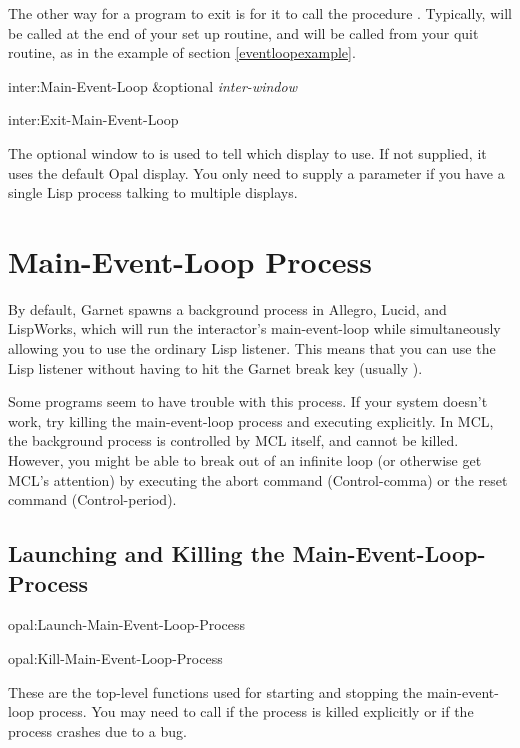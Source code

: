 The other way for a program to exit  is for it to call
the procedure .  Typically,
 will be called at the end of your set up
routine, and  will be called from your quit
routine, as in the example of section \ref{eventloopexample}.

\begin{programexample}
inter:Main-Event-Loop \&optional {\it inter-window}\value{function}

inter:Exit-Main-Event-Loop\value{function}
\end{programexample}

The optional window to  is used to tell which display
to use.  If not supplied, it uses the default Opal display.  You only need
to supply a parameter if you have a single Lisp
process talking to multiple displays.


\section{Main-Event-Loop Process}
By default, Garnet spawns a background process in Allegro, Lucid, and
LispWorks, which will run the interactor's main-event-loop while simultaneously
allowing you to use the ordinary Lisp listener.
This means that you can use the Lisp
listener without having to hit the Garnet break key (usually ).

Some programs seem to have trouble with this process.  If your system doesn't
work, try killing the main-event-loop process and executing
 explicitly.  In MCL, the background
process is controlled by MCL itself, and cannot be killed.  However,
you might be able to break out of an infinite loop (or otherwise get
MCL's attention) by executing the abort command (Control-comma) or the
reset command (Control-period).


\begin{group}
\subsection{Launching and Killing the Main-Event-Loop-Process}

\vspace{1 line}
\begin{programexample}
opal:Launch-Main-Event-Loop-Process \value{function}

opal:Kill-Main-Event-Loop-Process \value{function}
\end{programexample}

These are the top-level functions used for starting and stopping the
main-event-loop process.
You may need to call  if the
process is killed explicitly or if the process crashes due to a bug.
\end{group}
\vspace{1 line}

